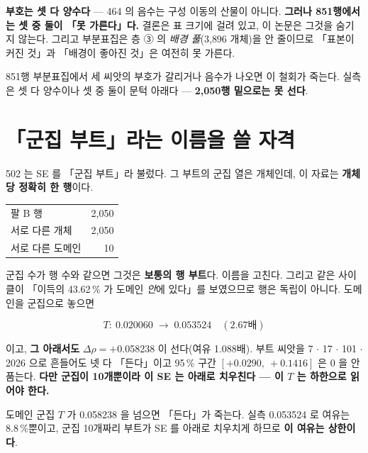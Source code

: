 \documentclass[10pt]{article}
\begin{document}
\textbf{부호는 셋 다 양수다} --- 464 의 음수는 구성 이동의 산물이 아니다. \textbf{그러나
851행에서는 셋 중 둘이 「못 가른다」다.} 결론은 표 크기에 걸려 있고, 이 논문은 그것을
숨기지 않는다. 그리고 부분표집은 층 ③ 의 \emph{배경 풀}(3{,}896 개체)을 안 줄이므로
「표본이 커진 것」과 「배경이 좋아진 것」은 여전히 못 가른다.

{851행 부분표집에서 세 씨앗의 부호가 갈리거나 음수가 나오면 이 철회가 죽는다.
실측은 셋 다 양수이나 셋 중 둘이 문턱 아래다 --- \textbf{2{,}050행 밑으로는 못 선다}.}

\section{「군집 부트」라는 이름을 쓸 자격}

502 는 SE 를 「군집 부트」라 불렀다. 그 부트의 군집 열은 개체인데, 이 자료는
\textbf{개체당 정확히 한 행}이다.

\begin{center}\small
\begin{tabular}{lr}
\hline
팔 B 행 & 2{,}050 \\
서로 다른 개체 & 2{,}050 \\
서로 다른 도메인 & 10 \\
\hline
\end{tabular}
\end{center}

군집 수가 행 수와 같으면 그것은 \textbf{보통의 행 부트}다. 이름을 고친다. 그리고 같은
사이클이 「이득의 43.62\,\% 가 도메인 \emph{안}에 있다」를 보였으므로 행은 독립이 아니다.
도메인을 군집으로 놓으면

\[
T:\ 0.020060 \;\longrightarrow\; 0.053524 \quad (2.67\text{배})
\]

이고, \textbf{그 아래서도} $\Delta\rho = +$0.058238 이 선다(여유 1.088배). 부트 씨앗을
7 $\cdot$ 17 $\cdot$ 101 $\cdot$ 2026 으로 흔들어도 넷 다 「든다」이고 95\,\% 구간
$[+0.0290,\ +0.1416]$ 은 0 을 안 품는다. \textbf{다만 군집이 10개뿐이라 이 SE 는 아래로
치우친다 --- 이 $T$ 는 하한으로 읽어야 한다.}

{도메인 군집 $T$ 가 0.058238 을 넘으면 「든다」가 죽는다. 실측 0.053524 로 여유는 8.8\,\%뿐이고,
군집 10개짜리 부트가 SE 를 아래로 치우치게 하므로 \textbf{이 여유는 상한이다}.}
\end{document}
